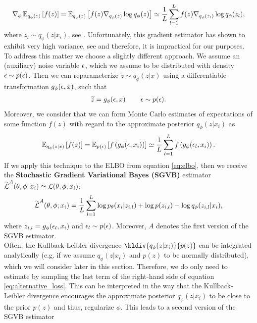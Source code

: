 \begin{align*}
\nabla_{\phi} \operatorname{\mathbb{E}}_{q_{\phi}(z)} \left[ f(z) \right] = \operatorname{\mathbb{E}}_{q_{\phi}(z)} \left[ f(z) \nabla_{q_{\phi}(z)}\log q_{\phi} (z)\right] \simeq \frac{1}{L} \sum_{l=1}^L f(z) \nabla_{q_{\phi}(z_l)}\log q_{\phi} (z_l),
\end{align*}
where $z_l \sim q_{\phi}(z|x_i)$, see \cite[Section~2.2]{kingma2013auto}. Unfortunately, this gradient estimator has shown to exhibit very high variance, see \cite{paisley2012variational} and therefore, it is impractical for our purposes. To address this matter we choose a slightly different approach. We assume an (auxiliary) noise variable $\operatorname{\epsilon}$, which we assume to be distributed with density $\operatorname{\epsilon}\sim p(\operatorname{\epsilon})$. Then we can reparameterize $\tilde{z}\sim q_{\phi}(z|x)$ using a differentiable transformation $g_{\phi}(\operatorname{\epsilon}, x)$, such that
\begin{align*}
\widetilde{z} = g_{\phi} (\operatorname{\epsilon}, x)\qquad \operatorname{\epsilon} \sim p(\operatorname{\epsilon}).
\end{align*}
Moreover, we consider that we can form Monte Carlo estimates of expectations of some function $f(z)$ with regard to the approximate posterior $q_{\phi}(z|x_i)$ as
\begin{align*}
\operatorname{\mathbb{E}}_{q_{\phi}(z|x)} \left[ f(z) \right] = \operatorname{\mathbb{E}}_{p(\operatorname{\epsilon})} \left[ f\left(g_{\phi} (\operatorname{\epsilon}, x_i)\right) \right] \simeq \frac{1}{L} \sum_{l=1}^L f\left(g_{\phi} (\operatorname{\epsilon}_l, x_i) \right).
\end{align*}
If we apply this technique to the ELBO from equation \eqref{eq:elbo}, then we receive the \textbf{Stochastic Gradient Variational Bayes (SGVB)} estimator $\widetilde{\operatorname{\mathcal{L}}}^{A}(\theta, \phi; x_i) \simeq \operatorname{\mathcal{L}}(\theta, \phi; x_i)$:
\begin{align*}
\widetilde{\operatorname{\mathcal{L}}}^{A}(\theta, \phi; x_i) = \frac{1}{L} \sum_{l=1}^L \log  p_{\theta}(x_i|z_{i,l}) + \log p(z_{i,l}) - \log q_{\phi}(z_{i,l}|x_i),
\end{align*}
where $z_{i,l} = g_{\phi} (\operatorname{\epsilon}_l, x_i)$ and $\operatorname{\epsilon}_l\sim p(\operatorname{\epsilon})$. Moreover, $A$ denotes the first version of the SGVB estimator.\\
Often, the Kullback-Leibler divergence $\kldiv{q_{\phi}(z|x_i)}{p(z)}$ can be integrated analytically (e.g. if we assume $q_{\phi}(z|x_i)$ and $p(z)$ to be normally distributed), which we will consider later in this section. Therefore, we do only need to estimate by sampling the last term of the right-hand side of equation \eqref{eq:alternative_loss}. This can be interpreted in the way that the Kullback-Leibler divergence encourages the approximate posterior $q_{\phi}(z|x_i)$ to be close to the prior $p(z)$ and thus, regularize $\phi$. This leads to a second version of the SGVB estimator
